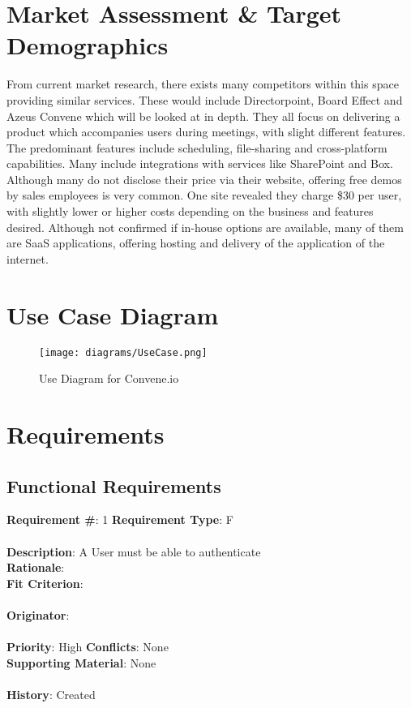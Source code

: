 \documentclass[11pt, oneside]{article}
\begin{document}
\section{Market Assessment \& Target Demographics}
From current market research, there exists many competitors within this space providing similar services.  These would include Directorpoint, Board Effect and Azeus Convene which will be looked at in depth. They all focus on delivering a product which accompanies users during meetings, with slight different features. The predominant features include scheduling, file-sharing and cross-platform capabilities. Many include integrations with services like SharePoint and Box. Although many do not disclose their price via their website, offering free demos by sales employees is very common. One site revealed they charge \$30 per user, with slightly lower or higher costs depending on the business and features desired. Although not confirmed if in-house options are available, many of them are SaaS applications, offering hosting and delivery of the application of the internet. 
\section{Use Case Diagram}
\begin{figure}[htbp]
   \centering
   \texttt{[image: diagrams/UseCase.png]}
   \caption{Use Diagram for Convene.io}
   \label{fig:useCaseDiagram}
\end{figure}
\section{Requirements}
\subsection{Functional Requirements}
\begin{framed}
	\noindent\textbf{Requirement \#}: 1 \hfill \textbf{Requirement Type}: F \hfill\\\\
	\noindent\textbf{Description}: A User must be able to authenticate \\
	\textbf{Rationale}: \\
	\textbf{Fit Criterion}: \\\\
	\textbf{Originator}: \\\\
	\textbf{Priority}: High \hfill \textbf{Conflicts}: None \hfill\\
	\textbf{Supporting Material}: None\\\\
	\noindent\textbf{History}: Created 
\end{framed}
\end{document}
